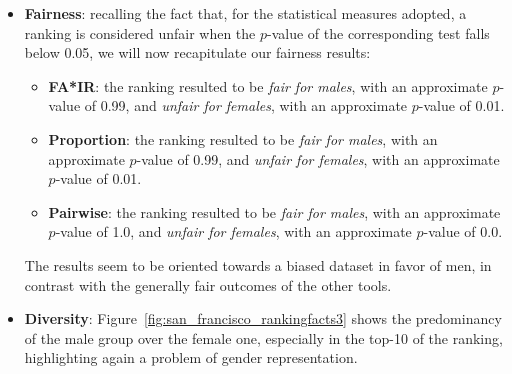 \begin{itemize}
\item \textbf{Fairness}: recalling the fact that, for the statistical measures adopted, a ranking is considered unfair when the \(p\)-value of the corresponding test falls below 0.05, we will now recapitulate our fairness results:
\begin{itemize}
\item \textbf{FA*IR}: the ranking resulted to be \textit{fair for males}, with an approximate \(p\)-value of 0.99, and \textit{unfair for females}, with an approximate \(p\)-value of 0.01.
\item \textbf{Proportion}: the ranking resulted to be \textit{fair for males}, with an approximate \(p\)-value of 0.99, and \textit{unfair for females}, with an approximate \(p\)-value of 0.01.
\item \textbf{Pairwise}: the ranking resulted to be \textit{fair for males}, with an approximate \(p\)-value of 1.0, and \textit{unfair for females}, with an approximate \(p\)-value of 0.0.
\end{itemize}
The results seem to be oriented towards a biased dataset in favor of men, in contrast with the generally fair outcomes of the other tools.
\item \textbf{Diversity}: Figure~\ref{fig:san_francisco_rankingfacts3} shows the predominancy of the male group over the female one, especially in the top-10 of the ranking, highlighting again a problem of gender representation.


\end{itemize}
